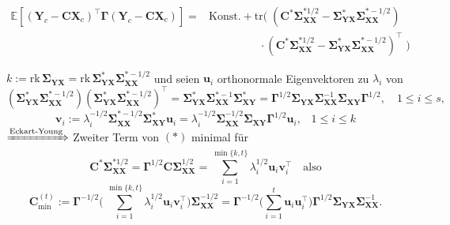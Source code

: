 \documentclass[12pt, aspectratio=169]{beamer}
\newcommand{\E}{\mathbb{E}}
\newcommand{\X}{\mathbf{X}}
\newcommand{\Y}{\mathbf{Y}}
\newcommand{\Ssigma}{\bm{\Sigma}}
\newcommand{\vv}{\mathbf{v}}
\newcommand{\uu}{\mathbf{u}}
\newcommand{\C}{\mathbf{C}}
\newcommand{\rk}{\mathrm{rk}}
\newcommand{\Ggamma}{\bm{\Gamma}}
\newcommand{\tr}{\mathrm{tr}}
\begin{document}
\begin{frame}
\begin{alertblock}{}
	\setlength\abovedisplayskip{0pt}
	\begin{align*}
	\E[(\Y_c - \C \X_c)^\top \Ggamma (\Y_c - \C \X_c)] ={}& \text{Konst.} 
	+ \tr( \; (\C^\ast \Ssigma_{\X\X}^{\ast 1/2} - \Ssigma_{\Y\X}^\ast \Ssigma_{\X\X}^{\ast -1/2}) \\
	&  \;\; \quad \quad \qquad \cdot (\C^\ast \Ssigma_{\X\X}^{\ast 1/2} - \Ssigma_{\Y\X}^\ast \Ssigma_{\X\X}^{\ast -1/2})^\top \;)
	\end{align*}
\end{alertblock}
	$k:= \rk \, \Ssigma_{\Y\X} = \rk \, \Ssigma_{\Y\X}^\ast \Ssigma_{\X\X}^{\ast -1/2}$
	und seien $\uu_i$ orthonormale Eigenvektoren zu $\lambda_i$ von
	$$(\Ssigma_{\Y\X}^\ast \Ssigma_{\X\X}^{\ast -1/2})(\Ssigma_{\Y\X}^\ast \Ssigma_{\X\X}^{\ast -1/2})^\top = \Ssigma_{\Y\X}^\ast \Ssigma_{\X\X}^{\ast -1} \Ssigma_{\X\Y}^\ast = \Ggamma^{1/2} \Ssigma_{\Y\X} \Ssigma_{\X\X}^{-1} \Ssigma_{\X\Y} \Ggamma^{1/2}, \quad 1 \leq i \leq s,$$
	$$\vv_i := \lambda_i^{-1/2} \Ssigma_{\X\X}^{\ast -1/2} \Ssigma_{\X\Y}^\ast \uu_i = \lambda_i^{-1/2} \Ssigma_{\X\X}^{-1/2} \Ssigma_{\X\Y} \Ggamma^{1/2} \uu_i\text{,} \quad 1 \leq i \leq k$$
	$\xRightarrow[]{\text{Eckart-Young}}$ Zweiter Term von $(\ast)$ minimal für 
	$$\C^\ast \Ssigma_{\X\X}^{\ast 1/2} = \Ggamma^{1/2} \C \Ssigma_{\X\X}^{1/2} = \sum_{i=1}^{\min\{k, t\}} \lambda_i^{1/2} \uu_i \vv_i^\top \quad \text{also}$$
	$$\C^{(t)}_{\min} := \Ggamma^{-1/2} \biggl( \, \sum_{i=1}^{\min\{k, t\}} \lambda_i^{1/2} \uu_i \vv_i^\top \biggr) \Ssigma_{\X\X}^{-1/2}
	= \Ggamma^{-1/2} \biggl( \sum_{i=1}^{t} \uu_i \uu_i^\top \biggr) \Ggamma^{1/2} \Ssigma_{\Y\X} \Ssigma_{\X\X}^{-1} \text{.}$$
\end{frame}
\end{document}
